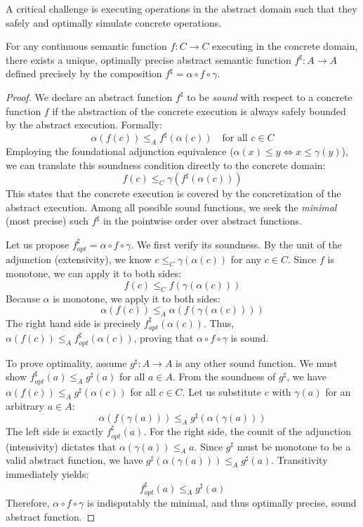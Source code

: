 A critical challenge is executing operations in the abstract domain such that they safely and optimally simulate concrete operations.

\begin{theorem}
\label{thm:optimal_abstraction}
For any continuous semantic function $f: C \to C$ executing in the concrete domain, there exists a unique, optimally precise abstract semantic function $f^\sharp: A \to A$ defined precisely by the composition $f^\sharp = \alpha \circ f \circ \gamma$.
\end{theorem}
\begin{proof}
We declare an abstract function $f^\sharp$ to be \emph{sound} with respect to a concrete function $f$ if the abstraction of the concrete execution is always safely bounded by the abstract execution. Formally:
\[ \alpha(f(c)) \leq_A f^\sharp(\alpha(c)) \quad \text{for all } c \in C \]
Employing the foundational adjunction equivalence ($\alpha(x) \leq y \iff x \leq \gamma(y)$), we can translate this soundness condition directly to the concrete domain:
\[ f(c) \leq_C \gamma(f^\sharp(\alpha(c))) \]
This states that the concrete execution is covered by the concretization of the abstract execution.
Among all possible sound functions, we seek the \emph{minimal} (most precise) such $f^\sharp$ in the pointwise order over abstract functions. 

Let us propose $f^\sharp_{opt} = \alpha \circ f \circ \gamma$. We first verify its soundness. By the unit of the adjunction (extensivity), we know $c \leq_C \gamma(\alpha(c))$ for any $c \in C$. Since $f$ is monotone, we can apply it to both sides:
\[ f(c) \leq_C f(\gamma(\alpha(c))) \]
Because $\alpha$ is monotone, we apply it to both sides:
\[ \alpha(f(c)) \leq_A \alpha(f(\gamma(\alpha(c)))) \]
The right hand side is precisely $f^\sharp_{opt}(\alpha(c))$. Thus, $\alpha(f(c)) \leq_A f^\sharp_{opt}(\alpha(c))$, proving that $\alpha \circ f \circ \gamma$ is sound.

To prove optimality, assume $g^\sharp: A \to A$ is any other sound function. We must show $f^\sharp_{opt}(a) \leq_A g^\sharp(a)$ for all $a \in A$.
From the soundness of $g^\sharp$, we have $\alpha(f(c)) \leq_A g^\sharp(\alpha(c))$ for all $c \in C$. 
Let us substitute $c$ with $\gamma(a)$ for an arbitrary $a \in A$:
\[ \alpha(f(\gamma(a))) \leq_A g^\sharp(\alpha(\gamma(a))) \]
The left side is exactly $f^\sharp_{opt}(a)$. For the right side, the counit of the adjunction (intensivity) dictates that $\alpha(\gamma(a)) \leq_A a$. Since $g^\sharp$ must be monotone to be a valid abstract function, we have $g^\sharp(\alpha(\gamma(a))) \leq_A g^\sharp(a)$.
Transitivity immediately yields:
\[ f^\sharp_{opt}(a) \leq_A g^\sharp(a) \]
Therefore, $\alpha \circ f \circ \gamma$ is indisputably the minimal, and thus optimally precise, sound abstract function.
\end{proof}

